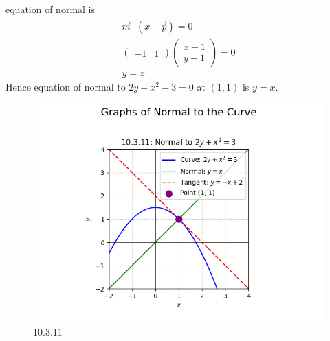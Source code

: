 \documentclass[journal]{IEEEtran}
\begin{document}
equation of normal is
\begin{align}
    \vec{m}^\top(\vec{x-p})=0\\
    \begin{pmatrix} -1&1\end{pmatrix}\begin{pmatrix}x-1\\y-1   \end{pmatrix}=0\\
        y=x
\end{align}
Hence equation of normal to $2y + x^2 - 3 = 0$ at $(1,1)$ is $y = x$.

\begin{figure}[H]
    \centering
    \includegraphics[width=0.85\columnwidth]{figs/graph-17.png}
    \caption{10.3.11}
    \label{fig:placeholder}
\end{figure}
\end{document}
